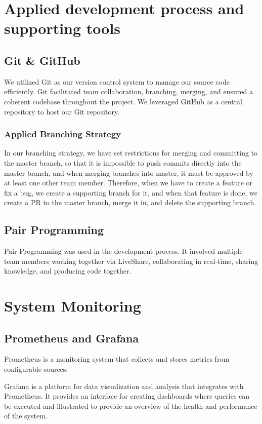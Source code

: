 \section{Applied development process and supporting tools}

\subsection{Git \& GitHub}

We utilized Git as our version control system to manage our source code efficiently. Git facilitated team collaboration, branching, merging, and ensured a coherent codebase throughout the project. We leveraged GitHub as a central repository to host our Git repository.

\subsubsection{Applied Branching Strategy}
In our branching strategy, we have set restrictions for merging and committing to the master branch, so that it is impossible to push commits directly into the master branch, and when merging branches into master, it must be approved by at least one other team member. Therefore, when we have to create a feature or fix a bug, we create a supporting branch for it, and when that feature is done, we create a \gls{PR} to the master branch, merge it in, and delete the supporting branch.

\subsection{Pair Programming}
Pair Programming was used in the development process. It involved multiple team members working together via LiveShare, collaborating in real-time, sharing knowledge, and producing code together.



\section{System Monitoring}

\subsection{Prometheus and Grafana}
Prometheus is a monitoring system that collects and stores metrics from configurable sources.

Grafana is a platform for data visualization and analysis that integrates with Prometheus. It provides an interface for creating dashboards where queries can be executed and illustrated to provide an overview of the health and performance of the system.

